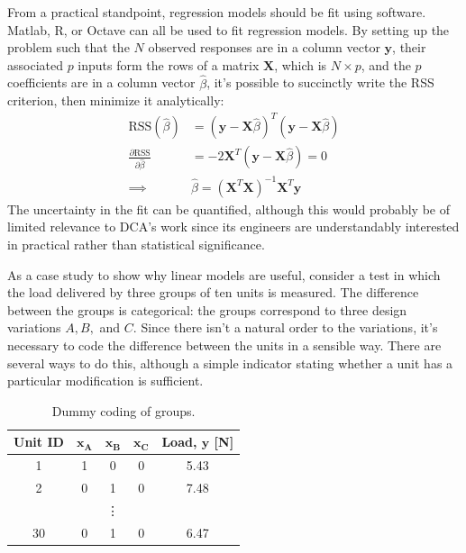 \documentclass[11pt,a4paper,article]{memoir} %
\begin{document}
From a practical standpoint, regression models should be fit using software. Matlab, R, or Octave can all be used to fit regression models. By setting up the problem such that the $N$ observed responses are in a column vector $\mathbf{y}$, their associated $p$ inputs form the rows of a matrix $\mathbf{X}$, which is $N \times p$, and the $p$ coefficients are in a column vector $\hat{\beta}$, it's possible to succinctly write the RSS criterion, then minimize it analytically:
\begin{align}
	\text{RSS}(\hat{\beta}) &= (\mathbf{y - X}\hat{\beta})^T(\mathbf{y - X}\hat{\beta}) \\
	\frac{\partial \text{RSS}}{\partial \hat{\beta}} &= -2\mathbf{X}^T(\mathbf{y - X}\hat{\beta}) = 0 \\
	\implies &\hat{\beta} = (\mathbf{X}^T\mathbf{X})^{-1}\mathbf{X}^T \mathbf{y} \label{eq:normal_eqtn}
\end{align}
The uncertainty in the fit can be quantified, although this would probably be of limited relevance to DCA's work since its engineers are understandably interested in practical rather than statistical significance. 

As a case study to show why linear models are useful, consider a test in which the load delivered by three groups of ten units is measured. The difference between the groups is categorical: the groups correspond to three design variations $A, B,$ and $C$. Since there isn't a natural order to the variations, it's necessary to code the difference between the units in a sensible way. There are several ways to do this, although a simple indicator stating whether a unit has a particular modification is sufficient.
\begin{table}
\centering
\caption{Dummy coding of groups.}
\small
\begin{tabular}{c c c c c}
\toprule
\textbf{Unit ID}                 & $\mathbf{x_A}$ & $\mathbf{x_B}$ & $\mathbf{x_C}$ & \textbf{Load, $\mathbf{y}$ [N]} \\
\midrule
1                       & 1 & 0 & 0 & 5.43         \\
2                       & 0 & 1 & 0 & 7.48         \\ 
& & \vdots & & \\
30 & 0 & 1 & 0 & 6.47 \\
\bottomrule
\end{tabular}
\end{table}
\end{document}
